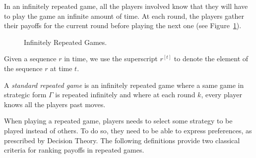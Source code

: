In an infinitely repeated game, all the players involved know that they
will have to play the game an infinite amount of time.
At each round, the players gather their payoffs for the current round before
playing the next one (see Figure~\ref{fig:infiRepeated}).
\begin{figure}
    \centering
    \caption{Infinitely Repeated Games.}
    \label{fig:infiRepeated}
\end{figure}

\begin{notation}
Given a sequence $r$ in time, we use the superscript $r^{[t]}$ to denote
the element of the sequence $r$ at time $t$.
\end{notation}

\begin{definition}
A \emph{standard repeated game} is an infinitely repeated game where a
same game in strategic form $\Gamma$ is repeated infinitely and where at each round $k$,
every player knows all the players past moves.
\end{definition}

When playing a repeated game, players needs to select some strategy to be
played instead of others. To do so, they need to be able to express
preferences, as prescribed by Decision Theory.
The following definitions provide two classical criteria for ranking
payoffs in repeated games.


